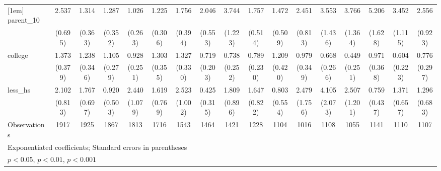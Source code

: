 {\begin{tabular}{l*{16}{c}}
[1em]
parent\_10           &       2.537\sym{***}&       1.314         &       1.287         &       1.026         &       1.225         &       1.756\sym{*}  &       2.046\sym{**} &       3.744\sym{***}&       1.757         &       1.472         &       2.451\sym{**} &       3.553\sym{**} &       3.766\sym{***}&       5.206\sym{***}&       3.452\sym{***}&       2.556\sym{**} \\
                    &     (0.695)         &     (0.363)         &     (0.352)         &     (0.263)         &     (0.306)         &     (0.394)         &     (0.553)         &     (1.223)         &     (0.514)         &     (0.509)         &     (0.813)         &     (1.436)         &     (1.364)         &     (1.628)         &     (1.115)         &     (0.923)         \\
[1em]
college             &       1.373         &       1.238         &       1.105         &       0.928         &       1.303         &       1.327         &       0.719         &       0.738         &       0.789         &       1.209         &       0.979         &       0.668         &       0.449         &       0.971         &       0.604         &       0.776         \\
                    &     (0.379)         &     (0.346)         &     (0.279)         &     (0.251)         &     (0.355)         &     (0.330)         &     (0.203)         &     (0.252)         &     (0.230)         &     (0.420)         &     (0.349)         &     (0.266)         &     (0.251)         &     (0.368)         &     (0.223)         &     (0.297)         \\
[1em]
less\_hs             &       2.102         &       1.767         &       0.920         &       2.440\sym{*}  &       1.619         &       2.523\sym{*}  &       0.425         &       1.809         &       1.647         &       0.803         &       2.479         &       4.105\sym{**} &       2.507         &       0.759         &       1.371         &       1.296         \\
                    &     (0.813)         &     (0.697)         &     (0.503)         &     (1.079)         &     (0.769)         &     (1.002)         &     (0.315)         &     (0.896)         &     (0.822)         &     (0.554)         &     (1.756)         &     (2.073)         &     (1.201)         &     (0.437)         &     (0.657)         &     (0.683)         \\
\hline
Observations        &        1917         &        1925         &        1867         &        1813         &        1716         &        1543         &        1464         &        1421         &        1228         &        1104         &        1016         &        1108         &        1055         &        1141         &        1110         &        1107         \\
\hline\hline
\multicolumn{17}{l}{\footnotesize Exponentiated coefficients; Standard errors in parentheses}\\
\multicolumn{17}{l}{\footnotesize \sym{*} \(p<0.05\), \sym{**} \(p<0.01\), \sym{***} \(p<0.001\)}\\
\end{tabular}
}
